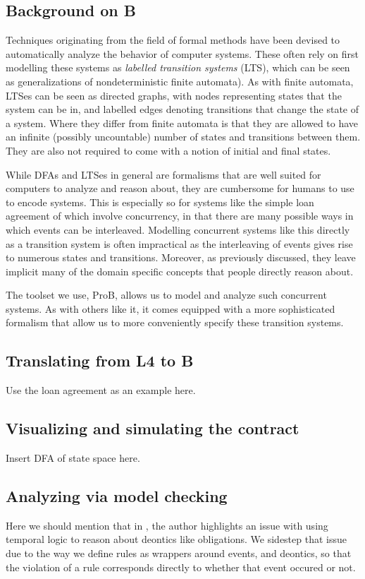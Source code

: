 \documentclass{article}
\begin{document}
\subsection{Background on B}
Techniques originating from the field of formal methods have been devised to
automatically analyze the behavior of computer systems.
These often rely on first modelling these systems as
\textit{labelled transition systems} (LTS), which can be seen as
generalizations of nondeterministic finite automata).
As with finite automata, LTSes can be seen as directed graphs, with nodes
representing states that the system can be in, and labelled edges denoting
transitions that change the state of a system.
Where they differ from finite automata is that they are allowed to have an
infinite (possibly uncountable) number of states and transitions
between them.
They are also not required to come with a notion of initial and final states.

While DFAs and LTSes in general are formalisms that are well suited for
computers to analyze and reason about, they are cumbersome for humans to use
to encode systems.
This is especially so for systems like the simple loan agreement of
\cite{contract_as_automaton} which involve concurrency, in that there are
many possible ways in which events can be interleaved.
Modelling concurrent systems like this directly as a transition system is
often impractical as the interleaving of events gives rise to numerous states
and transitions.
Moreover, as previously discussed, they leave implicit many of the domain
specific concepts that people directly reason about.

The toolset we use, ProB, allows us to model and analyze such concurrent systems.
As with others like it, it comes equipped with a more sophisticated formalism
that allow us to more conveniently specify these transition systems.

\subsection{Translating from L4 to B}
Use the loan agreement as an example here.

\subsection{Visualizing and simulating the contract}
Insert DFA of state space here.

\subsection{Analyzing via model checking}
Here we should mention that in \cite{temporal_logic_norms_guido}, the author
highlights an issue with using temporal logic to reason about deontics like
obligations.
We sidestep that issue due to the way we define rules as wrappers around
events, and deontics, so that the violation of a rule corresponds directly to
whether that event occured or not.
\end{document}

